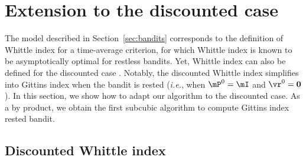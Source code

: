 \section{Extension to the discounted case}
\label{sec:discounted}

The model described in Section~\ref{sec:bandits} corresponds to the definition of Whittle index for a time-average criterion, for which Whittle index is known to be asymptotically optimal \cite{weber1990index} for restless bandits. Yet, Whittle index can also be defined for the discounted case \cite{nino2020fast, akbarzadeh2020conditions}. Notably, the discounted Whittle index simplifies into Gittins index when the bandit is rested (\emph{i.e.}, when $\mP^0=\mI$ and $\vr^0=\boldsymbol{0}$). In this section, we show how to adapt our algorithm to the discounted case. As a by product, we obtain the first subcubic algorithm to compute Gittins index rested bandit.

\subsection{Discounted Whittle index}

